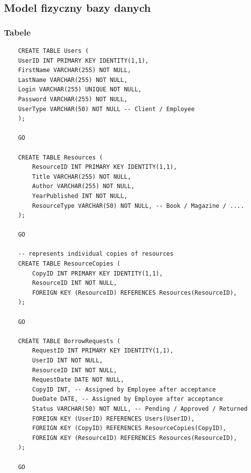 \subsection{Model fizyczny bazy danych}

\subsubsection{Tabele}
\begin{verbatim}
    CREATE TABLE Users (
    UserID INT PRIMARY KEY IDENTITY(1,1),
    FirstName VARCHAR(255) NOT NULL,
    LastName VARCHAR(255) NOT NULL,
    Login VARCHAR(255) UNIQUE NOT NULL,
    Password VARCHAR(255) NOT NULL,
    UserType VARCHAR(50) NOT NULL -- Client / Employee
    );

    GO

    CREATE TABLE Resources (
        ResourceID INT PRIMARY KEY IDENTITY(1,1),
        Title VARCHAR(255) NOT NULL,
        Author VARCHAR(255) NOT NULL,
        YearPublished INT NOT NULL,
        ResourceType VARCHAR(50) NOT NULL, -- Book / Magazine / ....
    );

    GO

    -- represents individual copies of resources
    CREATE TABLE ResourceCopies (
        CopyID INT PRIMARY KEY IDENTITY(1,1),
        ResourceID INT NOT NULL,
        FOREIGN KEY (ResourceID) REFERENCES Resources(ResourceID),
    );

    GO

    CREATE TABLE BorrowRequests (
        RequestID INT PRIMARY KEY IDENTITY(1,1),
        UserID INT NOT NULL,
        ResourceID INT NOT NULL,
        RequestDate DATE NOT NULL,
        CopyID INT, -- Assigned by Employee after acceptance
        DueDate DATE, -- Assigned by Employee after acceptance
        Status VARCHAR(50) NOT NULL, -- Pending / Approved / Returned
        FOREIGN KEY (UserID) REFERENCES Users(UserID),
        FOREIGN KEY (CopyID) REFERENCES ResourceCopies(CopyID),
        FOREIGN KEY (ResourceID) REFERENCES Resources(ResourceID),
    );

    GO
\end{verbatim}


